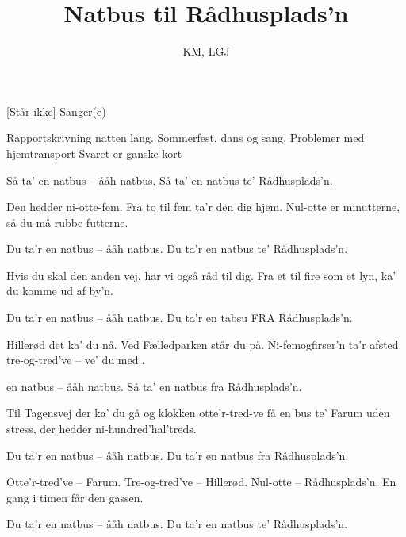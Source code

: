 \documentclass[a4paper,11pt]{article}
\title{Natbus til Rådhusplads'n}
\author{KM, LGJ}
\begin{document}
\maketitle

\begin{roles}
[Står ikke] Sanger(e)
\end{roles}


\begin{song}
%
Rapportskrivning natten lang.
Sommerfest, dans og sang.
Problemer med hjemtransport
Svaret er ganske kort

Så ta' en natbus -- ååh natbus.
Så ta' en natbus te' Rådhusplads'n.

Den hedder ni-otte-fem.
Fra to til fem ta'r den dig hjem.
Nul-otte er minutterne,
så du må rubbe futterne.

Du ta'r en natbus -- ååh natbus.
Du ta'r en natbus te' Rådhusplads'n.

Hvis du skal den anden vej,
har vi også råd til dig.
Fra et til fire som et lyn,
ka' du komme ud af by'n.

Du ta'r en natbus -- ååh natbus.
Du ta'r en tabsu FRA Rådhusplads'n.

Hillerød det ka' du nå.
Ved Fælledparken står du på.
Ni-femogfirser'n ta'r afsted
tre-og-tred've -- ve' du med..

en natbus -- ååh natbus.
Så ta' en natbus fra Rådhusplads'n.

Til Tagensvej der ka' du gå
og klokken otte'r-tred-ve få
en bus te' Farum uden stress,
der hedder ni-hundred'hal'treds.

Du ta'r en natbus -- ååh natbus.
Du ta'r en natbus fra Rådhusplads'n.

Otte'r-tred've -- Farum.
Tre-og-tred've -- Hillerød.
Nul-otte -- Rådhusplads'n.
En gang i timen får den gassen.

Du ta'r en natbus -- ååh natbus.
Du ta'r en natbus te' Rådhusplads'n.
\end{song}
\end{document}
